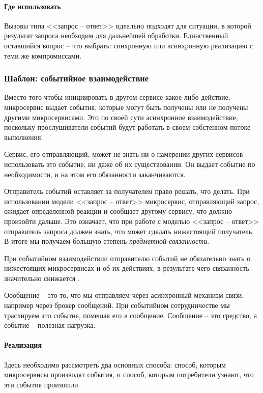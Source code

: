 \documentclass[%
	11pt,
	a4paper,
	utf8,
		]{article}
\begin{document}
\paragraph{Где использовать}

Вызовы типа <<запрос -- ответ>> идеально подходят для ситуации, в которой результат запроса необходим для дальнейшей обработки. Единственный оставшийся вопрос -- что выбрать: синхронную или асинхронную реализацию с теми же компромиссами.

\subsubsection{Шаблон: событийное взаимодействие}

Вместо того чтобы инициировать в другом сервисе какое-либо действие, микросервис выдает события, которые могут быть получены или не получены другими микросервисами. Это по своей сути асинхронное взаимодействие, поскольку прослушиватели событий будут работать в своем собстенном потоке выполнения.

Сервис, его отправляющий, может не знать ни о намерении других сервисов использовать это событие, ни даже об их существовании. Он выдает событие по необходимости, и на этом его обязанности заканчиваются.

Отправитель событий оставляет за получателем право решать, что делать. При использовании модели <<запрос -- ответ>> микросервис, отправляющий запрос, ожидает определенной реакции и сообщает другому сервису, что должно произойти дальше. Это означает, что при работе с моделью <<запрос -- ответ>> отправитель запроса должен знать, что может сделать нижестоящий получатель. В итоге мы получаем большую степень \emph{предметной связанности}.

При событийном взаимодействии отправителю событий не обязательно знать о нижестоящих микросервисах и об их действиях, в результате чего связанность значительно снижается \cite[]{microservices-2024}.

Оообщение -- это то, что мы отправляем через асинхронный механизм связи, например через брокер сообщений. При событийном сотрудничестве мы траслируем это событие, помещая его в сообщение. Сообщение -- это средство, а событие -- полезная нагрузка.

\paragraph{Реализация} Здесь необходимо рассмотреть два основных способа: способ, которым микросервисы производят события, и способ, которым потребители узнают, что эти события произошли.
\end{document}
